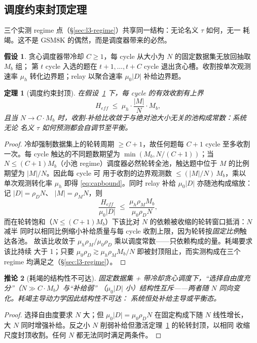 \documentclass[11pt]{article}
\newtheorem{theorem}{定理}
\newtheorem{corollary}[theorem]{推论}
\theoremstyle{definition}
\newtheorem{assumption}{假设}
\begin{document}
\subsection{调度约束封顶定理}\label{sec:l3-thm}
三个实测 regime 点（\S\ref{sec:l3-regime}）共享同一结构：无论名义 $\tau$ 如何，无一
耗竭。这不是 GSM8K 的偶然，而是调度器带来的必然。

\begin{assumption}\label{asm:cap}
贪心调度器带冷却 $C\ge1$，每 cycle 从大小为 $N$ 的固定数据集无放回抽取 $M_b$ 组；
第 $t$ cycle 入选的题在 $t{+}1,\dots,t{+}C$ cycle 退出贪心槽。收割按单次观测速率
$\mu_h$ 转化边界题；relay 以聚合速率 $\mu_0|D|$ 补给边界题。
\end{assumption}

\begin{theorem}[调度约束封顶]\label{thm:cap}
在假设~\ref{asm:cap} 下，每 cycle 的有效收割有上界
\begin{equation}\label{eq:capbound}
H_{eff} \;\le\; \mu_h \cdot \frac{|M|}{N} \cdot M_b ,
\end{equation}
且当 $N\to C\cdot M_b$ 时，收割-补给比收敛于与绝对池大小无关的池构成常数：系统无论
名义 $\tau$ 如何预测都会自调节至平衡。
\end{theorem}
\begin{proof}
冷却强制数据集上的轮转周期 $\ge C{+}1$，故任何题每 $C{+}1$ cycle 至多收割一次。每
cycle 触达的不同题数期望为 $\min(M_b, N/(C{+}1))$；当 $N \le (C{+}1)M_b$（小池
regime）调度器必然轮转全池，触达题中位于 $M$ 的比例期望为 $|M|/N$。因此每 cycle 可
用于收割的边界观测数 $\le (|M|/N)\,M_b$，乘以单次观测转化率 $\mu_h$ 即得
\eqref{eq:capbound}。同时 relay 补给 $\mu_0|D|$ 亦随池构成缩放：记 $|D|=\rho_D N$、
$|M|=\rho_M N$，则
\[
\frac{H_{eff}}{\mu_0|D|} \;\le\; \frac{\mu_h \rho_M M_b}{\mu_0 \rho_D N} ,
\]
而在轮转饱和（$N{\le}(C{+}1)M_b$）下该比对 $N$ 的依赖被收缩的轮转窗口抵消：$N$ 减半
同时以相同比例缩小补给质量与每 cycle 收割上限，因为轮转按\emph{固定比例}触达各池。
故该比收敛于 $\mu_h\rho_M/\mu_0\rho_D$ 乘以调度常数——只依赖构成的量。耗竭要求该比持续
大于 1；只要 $\mu_0\rho_D \gtrsim \mu_h\rho_M M_b/N$ 即被封顶阻止，而实测构成在三个
regime 均满足之（\S\ref{sec:l3-regime}）。
\end{proof}

\begin{corollary}[耗竭的结构性不可达]\label{cor:unreach}
固定数据集 + 带冷却贪心调度下，“选择自由度充分”（$N\gg C\cdot M_b$）与“补给弱”
（$\mu_0|D|$ 小）结构性互斥——两者随 $N$ 同向变化。耗竭主导动力学因此结构性不可达：
系统恒处补给主导或平衡态。
\end{corollary}
\begin{proof}
选择自由度要求 $N$ 大；但 $\mu_0|D|=\mu_0\rho_D N$ 在固定构成下随 $N$ 线性增长，大
$N$ 同时增强补给。反之小 $N$ 削弱补给但激活定理~\ref{thm:cap} 的轮转封顶，以相同
收缩尺度封顶收割。任何 $N$ 都无法同时满足两条件。
\end{proof}
\end{document}
